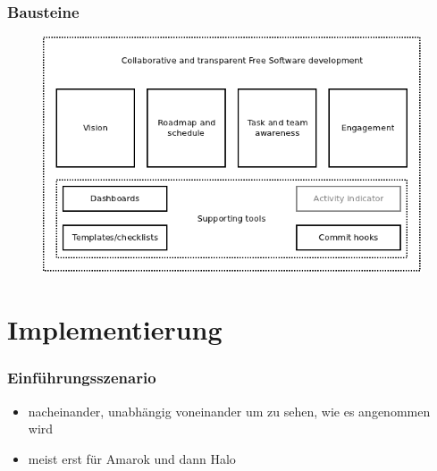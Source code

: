 \documentclass{beamer}
\begin{document}
\begin{frame}
\frametitle{Bausteine}
\begin{figure}[h]
 \centering
 \includegraphics[scale=0.5,keepaspectratio=true]{./buildingblocks.png}
\end{figure}
\end{frame}

\section{Implementierung}

\begin{frame}
\frametitle{Einf\"uhrungsszenario}
\begin{itemize}
 \item nacheinander, unabh\"angig voneinander um zu sehen, wie es angenommen wird
 \item meist erst f\"ur Amarok und dann Halo
\end{itemize}
\end{frame}
\end{document}
